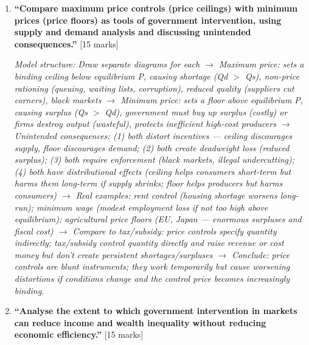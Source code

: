 \documentclass[11pt, a4paper, twoside]{book}
\begin{document}
\begin{exampractice}
\begin{enumerate}[leftmargin=*]
\item \textbf{``Compare maximum price controls (price ceilings) with minimum prices (price floors) as tools of government intervention, using supply and demand analysis and discussing unintended consequences.''} [15 marks]

\textit{Model structure: Draw separate diagrams for each $\to$ Maximum price: sets a binding ceiling below equilibrium P, causing shortage (Qd $>$ Qs), non-price rationing (queuing, waiting lists, corruption), reduced quality (suppliers cut corners), black markets $\to$ Minimum price: sets a floor above equilibrium P, causing surplus (Qs $>$ Qd), government must buy up surplus (costly) or firms destroy output (wasteful), protects inefficient high-cost producers $\to$ Unintended consequences: (1) both distort incentives — ceiling discourages supply, floor discourages demand; (2) both create deadweight loss (reduced surplus); (3) both require enforcement (black markets, illegal undercutting); (4) both have distributional effects (ceiling helps consumers short-term but harms them long-term if supply shrinks; floor helps producers but harms consumers) $\to$ Real examples: rent control (housing shortage worsens long-run); minimum wage (modest employment loss if not too high above equilibrium); agricultural price floors (EU, Japan — enormous surpluses and fiscal cost) $\to$ Compare to tax/subsidy: price controls specify quantity indirectly; tax/subsidy control quantity directly and raise revenue or cost money but don't create persistent shortages/surpluses $\to$ Conclude: price controls are blunt instruments; they work temporarily but cause worsening distortions if conditions change and the control price becomes increasingly binding.}

\item \textbf{``Analyse the extent to which government intervention in markets can reduce income and wealth inequality without reducing economic efficiency.''} [15 marks]


\end{enumerate}
\end{exampractice}
\end{document}
